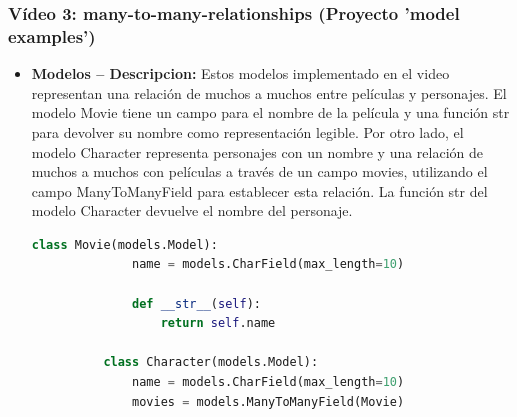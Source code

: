 \documentclass{article}
\begin{document}
  \subsubsection{Vídeo 3: many-to-many-relationships (Proyecto 'model examples')}
    \begin{itemize}
      \item \textbf{Modelos -- Descripcion: }Estos modelos implementado en el video representan una relación de muchos a muchos 
        entre películas y personajes. El modelo Movie tiene un campo para el nombre de la película y una función str 
        para devolver su nombre como representación legible. Por otro lado, el modelo Character representa personajes con un nombre 
        y una relación de muchos a muchos con películas a través de un campo movies, utilizando el campo ManyToManyField para 
        establecer esta relación. La función str del modelo Character devuelve el nombre del personaje.
        \begin{lstlisting}[language=Python]
          class Movie(models.Model):
              name = models.CharField(max_length=10)
              
              def __str__(self):
                  return self.name
                  
          class Character(models.Model):
              name = models.CharField(max_length=10)
              movies = models.ManyToManyField(Movie)
              

\end{lstlisting}
\end{itemize}
\end{document}
